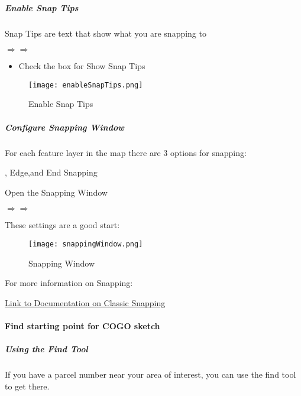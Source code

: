
\subparagraph{Enable Snap Tips}

Snap Tips are text that show what you are snapping to


{\bigbtn
\noindent {}$\Rightarrow$$\Rightarrow$ 
}


\begin{itemize}
\item Check the box for Show Snap Tips
\end{itemize}

\begin{figure}[h!]
\centering
    \texttt{[image: enableSnapTips.png]}

\caption{Enable Snap Tips}
\end{figure}

\clearpage

\subparagraph{Configure Snapping Window}

For each feature layer in the map there are 3 options for snapping:

, {\bigbtn Edge},and {\bigbtn End} Snapping

\vspace{.5in}

\noindent Open the Snapping Window

{\bigbtn
\noindent {}$\Rightarrow$$\Rightarrow$
}

\noindent These settings are a good start:


\begin{figure}[h!]
\centering
    \texttt{[image: snappingWindow.png]}

\caption{Snapping Window}
\end{figure}

{\bigbtn For more information on Snapping:}

\href{https://desktop.arcgis.com/en/arcmap/10.5/manage-data/editing-fundamentals/enabling-snapping-classic-snapping-.htm}{Link to Documentation on Classic Snapping}


\clearpage

\paragraph{Find starting point for COGO sketch}

\subparagraph{Using the Find Tool}

If you have a parcel number near your area of interest, you can use the find tool to get there.

